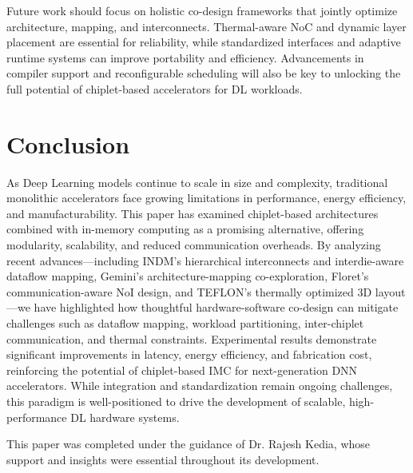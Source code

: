 \documentclass[acmsmall]{acmart}
\begin{document}
Future work should focus on holistic co-design frameworks that jointly optimize architecture, mapping, and interconnects. Thermal-aware NoC and dynamic layer placement are essential for reliability, while standardized interfaces and adaptive runtime systems can improve portability and efficiency. Advancements in compiler support and reconfigurable scheduling will also be key to unlocking the full potential of chiplet-based accelerators for DL workloads.

\section{Conclusion}
As Deep Learning models continue to scale in size and complexity, traditional monolithic accelerators face growing limitations in performance, energy efficiency, and manufacturability. This paper has examined chiplet-based architectures combined with in-memory computing as a promising alternative, offering modularity, scalability, and reduced communication overheads. By analyzing recent advances—including INDM’s hierarchical interconnects and interdie-aware dataflow mapping, Gemini’s architecture-mapping co-exploration, Floret's communication-aware NoI design, and TEFLON’s thermally optimized 3D layout—we have highlighted how thoughtful hardware-software co-design can mitigate challenges such as dataflow mapping, workload partitioning, inter-chiplet communication, and thermal constraints. Experimental results demonstrate significant improvements in latency, energy efficiency, and fabrication cost, reinforcing the potential of chiplet-based IMC for next-generation DNN accelerators. While integration and standardization remain ongoing challenges, this paradigm is well-positioned to drive the development of scalable, high-performance DL hardware systems.





\begin{acks}
This paper was completed under the guidance of Dr. Rajesh Kedia, whose support and insights were essential throughout its development.
\end{acks}






\end{document}

